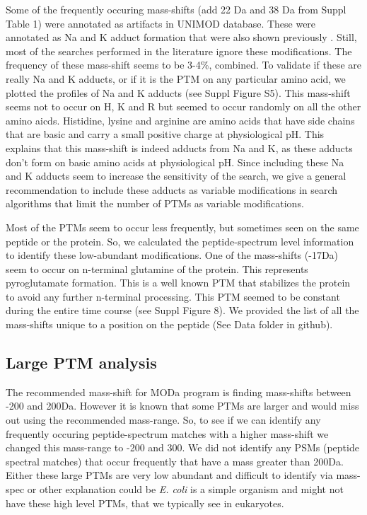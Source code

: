 \documentclass[12pt]{article}
\begin{document}
Some of the frequently occuring mass-shifts (add 22 Da and 38 Da from Suppl Table 1) were annotated as artifacts in UNIMOD database. These were annotated as Na and K adduct formation that were also shown previously \cite{SchugMcNair2003}. Still, most of the searches performed in the literature ignore these modifications. The frequency of these mass-shift seems to be 3-4\%, combined. To validate if these are really Na and K adducts, or if it is the PTM on any particular amino acid, we plotted the profiles of Na and K adducts (see Suppl Figure S5). This mass-shift seems not to occur on H, K and R but seemed to occur randomly on all the other amino aicds. Histidine, lysine and arginine are amino acids that have side chains that are basic and carry a small positive charge at physiological pH. This explains that this mass-shift is indeed adducts from Na and K, as these adducts don't form on basic amino acids at physiological pH. Since including these Na and K adducts seem to increase the sensitivity of the search, we give a general recommendation to include these adducts as variable modifications in search algorithms that limit the number of PTMs as variable modifications. 

Most of the PTMs seem to occur less frequently, but sometimes seen on the same peptide or the protein. So, we calculated the peptide-spectrum level information to identify these low-abundant modifications. One of the mass-shifts (-17Da) seem to occur on n-terminal glutamine of the protein. This represents pyroglutamate formation. This is a well known PTM that stabilizes the protein to avoid any further n-terminal processing. This PTM seemed to be constant during the entire time course (see Suppl Figure 8). We provided the list of all the mass-shifts unique to a position on the peptide (See Data folder in github).

\subsection{Large PTM analysis}



The recommended mass-shift for MODa program is finding mass-shifts between -200 and 200Da. However it is known that some PTMs are larger and would miss out using the recommended mass-range. So, to see if we can identify any frequently occuring peptide-spectrum matches with a higher mass-shift we changed this mass-range to -200 and 300. We did not identify any PSMs (peptide spectral matches) that occur frequently that have a mass greater than 200Da. Either these large PTMs are very low abundant and difficult to identify via mass-spec or other explanation could be \emph{E. coli} is a simple organism and might not have these high level PTMs, that we typically see in eukaryotes. 
\end{document}
